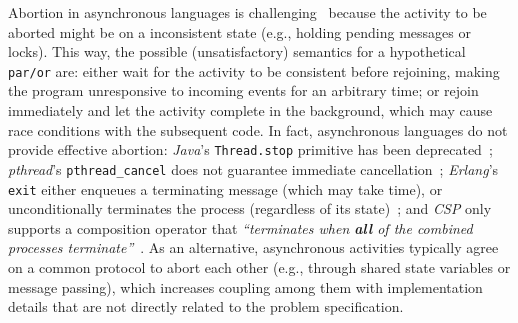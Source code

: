 \documentclass{acm_proc_article-sp}
\newcommand{\CEU}{\textsc{C\'{e}u}\xspace}
\newcommand{\code}[1] {{\small{\texttt{#1}}}}
\newcommand{\1}{\;}
\newcommand{\2}{\;\;}
\newcommand{\3}{\;\;\;}
\newcommand{\5}{\;\;\;\;\;}
\begin{document}


Abortion in asynchronous languages is challenging~\cite{esterel.preemption} 
because the activity to be aborted might be on a inconsistent state (e.g., 
holding pending messages or locks).
%
This way, the possible (unsatisfactory) semantics for a hypothetical 
\code{par/or} are:
either wait for the activity to be consistent before rejoining, making the 
program unresponsive to incoming events for an arbitrary time;
or rejoin immediately and let the activity complete in the background, which 
may cause race conditions with the subsequent code.
%
%
In fact, asynchronous languages do not provide effective abortion:
\emph{Java}'s \code{Thread.stop} primitive has been 
deprecated~\cite{sync_async.threadsstop};
\emph{pthread}'s \code{pthread\_cancel} does not guarantee immediate 
cancellation~\cite{sync_async.pthreadsstop};
\emph{Erlang}'s \code{exit} either enqueues a terminating message (which may 
take time), or unconditionally terminates the process (regardless of its 
state)~\cite{sync_async.erlangstop};
and \emph{CSP} only supports a composition operator that \emph{``terminates 
when \textbf{all} of the combined processes terminate''}~\cite{async.csp}.
%
As an alternative, asynchronous activities typically agree on a common protocol 
to abort each other (e.g., through shared state variables or message passing), 
which increases coupling among them with implementation details that are not 
directly related to the problem specification.


%
\end{document}
